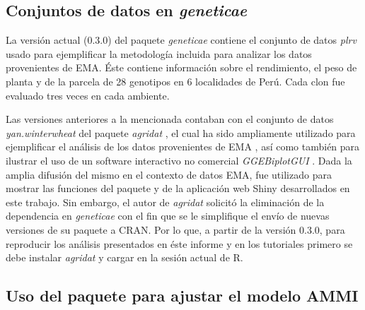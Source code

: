 \subsection{Conjuntos de datos en \emph{geneticae}}
\label{subsec:datosejemplos}
La versión actual (0.3.0) del paquete \emph{geneticae} contiene el conjunto de datos \emph{plrv} \citep{deMendiburu2020} usado para ejemplificar la metodología incluida para analizar los datos provenientes de EMA. Éste contiene información sobre el rendimiento, el peso de planta y de la parcela de 28 genotipos en 6 localidades de Perú. Cada clon fue evaluado tres veces en cada ambiente. 

   
Las versiones anteriores a la mencionada contaban con el conjunto de datos \emph{yan.winterwheat} del paquete \emph{agridat} \citep{Wright2020}, el cual ha sido ampliamente utilizado para ejemplificar el análisis de los datos provenientes de EMA \citep{Alarconetal2014, Alarconetal2020, Yan2013}, así como también para  ilustrar el uso de un software interactivo no comercial \emph{GGEBiplotGUI} \citep{FrutosGalindoLeiva2013}. Dada la amplia difusión del mismo en el contexto de datos EMA, fue utilizado para mostrar las funciones del paquete y de la aplicación web Shiny desarrollados en este trabajo. Sin embargo, el autor de \emph{agridat} solicitó la eliminación de la dependencia en \emph{geneticae} con el fin que se le simplifique el envío de nuevas versiones de su paquete a CRAN. Por lo que, a partir de la versión 0.3.0, para reproducir los análisis presentados en éste informe y en los tutoriales primero se debe instalar \emph{agridat} y cargar en la sesión actual de R.
 
  
\subsection{Uso del paquete para ajustar el modelo AMMI}

